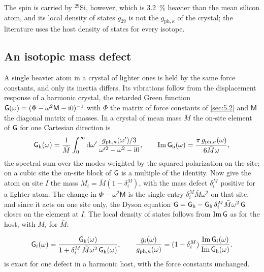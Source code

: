The spin is carried by $^{29}$Si, however, which is \SI{3.2}{\percent} heavier than the mean silicon atom, and its local density of states $g_{29}$ is not the $g_{\mathrm{ph},\kappa}$ of the crystal; the literature uses the host density of states for every isotope.

\subsection{An isotopic mass defect}\label{sec:11.6-defect}

A single heavier atom in a crystal of lighter ones is held by the same force constants, and only its inertia differs. Its vibrations follow from the displacement response of a harmonic crystal, the retarded Green function $\mathsf{G}(\omega) = (\Phi - \omega^2\mathsf{M} - \mathrm{i}0)^{-1}$ with $\Phi$ the matrix of force constants of \cref{sec:5.2} and $\mathsf{M}$ the diagonal matrix of masses. In a crystal of mean mass $\bar M$ the on-site element of $\mathsf{G}$ for one Cartesian direction is
\begin{equation*}
  \mathsf{G}_{\mathrm{h}}(\omega) = \frac{1}{\bar M}\int_0^{\infty}\mathrm{d}\omega'\,\frac{g_{\mathrm{ph},\kappa}(\omega')/3}{\omega'^2 - \omega^2 - \mathrm{i}0} , \qquad
  \operatorname{Im}\mathsf{G}_{\mathrm{h}}(\omega) = \frac{\pi\,g_{\mathrm{ph},\kappa}(\omega)}{6\bar M\omega} ,
\end{equation*}
the spectral sum over the modes weighted by the squared polarization on the site; on a cubic site the on-site block of $\mathsf{G}$ is a multiple of the identity. Now give the atom on site $I$ the mass $M_i = \bar M(1 - \delta^M_i)$, with the mass defect $\delta^M_i$ positive for a lighter atom. The change in $\Phi - \omega^2\mathsf{M}$ is the single entry $\delta^M_i\bar M\omega^2$ on that site, and since it acts on one site only, the Dyson equation $\mathsf{G} = \mathsf{G}_{\mathrm{h}} - \mathsf{G}_{\mathrm{h}}\,\delta^M_i\bar M\omega^2\,\mathsf{G}$ closes on the element at $I$. The local density of states follows from $\operatorname{Im}\mathsf{G}$ as for the host, with $M_i$ for $\bar M$:
\begin{keyresult}
\begin{equation}
  \mathsf{G}_i(\omega) = \frac{\mathsf{G}_{\mathrm{h}}(\omega)}{1 + \delta^M_i\,\bar M\omega^2\,\mathsf{G}_{\mathrm{h}}(\omega)} , \qquad
  \frac{g_i(\omega)}{g_{\mathrm{ph},\kappa}(\omega)} = (1 - \delta^M_i)\,\frac{\operatorname{Im}\mathsf{G}_i(\omega)}{\operatorname{Im}\mathsf{G}_{\mathrm{h}}(\omega)} .
  \label{eq:11.6-lifshitz}
\end{equation}
 is exact for one defect in a harmonic host, with the force constants unchanged.
\end{keyresult}
